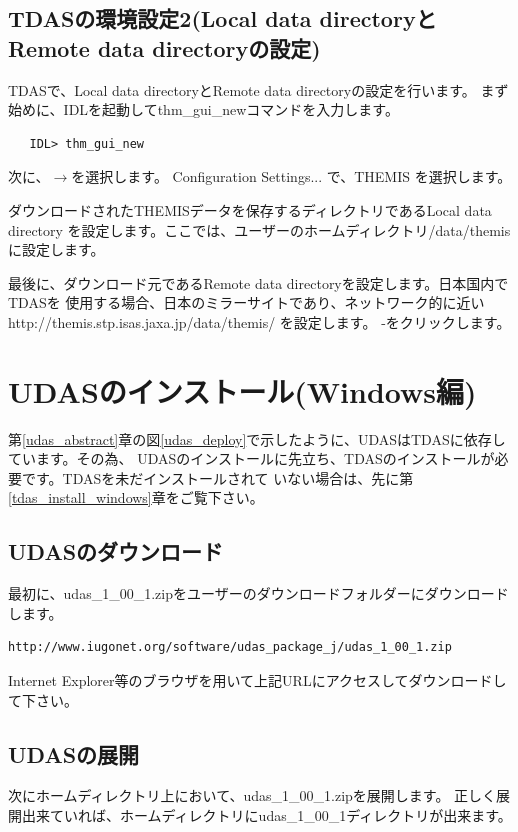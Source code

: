 \documentclass[a4j]{jbook}
\begin{document}
\section{TDASの環境設定2(Local data directoryとRemote data directoryの設定)}
 TDASで、Local data directoryとRemote data directoryの設定を行います。
まず始めに、IDLを起動してthm\_gui\_newコマンドを入力します。
\begin{screen}
\begin{verbatim}
   IDL> thm_gui_new
\end{verbatim}
\end{screen}
次に、$\rightarrow$を選択します。
Configuration Settings... で、THEMIS を選択します。\par
ダウンロードされたTHEMISデータを保存するディレクトリであるLocal data directory
を設定します。ここでは、ユーザーのホームディレクトリ/data/themisに設定します。\par
最後に、ダウンロード元であるRemote data directoryを設定します。日本国内でTDASを
使用する場合、日本のミラーサイトであり、ネットワーク的に近い
http://themis.stp.isas.jaxa.jp/data/themis/
を設定します。
-をクリックします。

\chapter{UDASのインストール(Windows編)}
\label{udas_install_windows}

第\ref{udas_abstract}章の図\ref{udas_deploy}で示したように、UDASはTDASに依存しています。その為、
UDASのインストールに先立ち、TDASのインストールが必要です。TDASを未だインストールされて
いない場合は、先に第\ref{tdas_install_windows}章をご覧下さい。

\section{UDASのダウンロード}
最初に、udas\_1\_00\_1.zipをユーザーのダウンロードフォルダーにダウンロードします。
\begin{screen}
\begin{verbatim}
http://www.iugonet.org/software/udas_package_j/udas_1_00_1.zip
\end{verbatim}
\end{screen}
Internet Explorer等のブラウザを用いて上記URLにアクセスしてダウンロードして下さい。

\section{UDASの展開}
次にホームディレクトリ上において、udas\_1\_00\_1.zipを展開します。
正しく展開出来ていれば、ホームディレクトリにudas\_1\_00\_1ディレクトリが出来ます。
\end{document}
